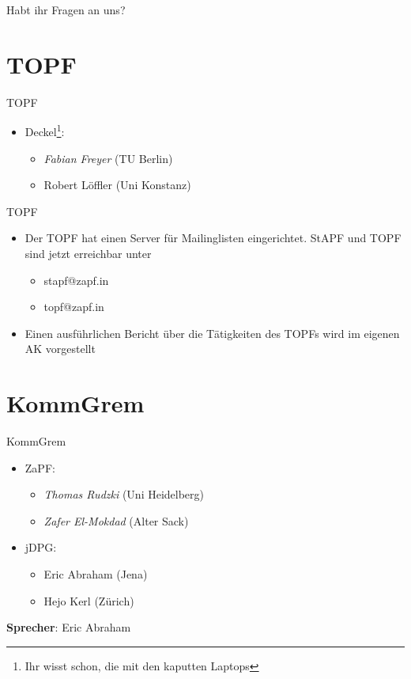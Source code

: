 \documentclass[compress, aspectratio=169]{beamer}
\begin{document}
\begin{frame}[plain]
	\begin{center}
		\Huge Habt ihr Fragen an uns?
	\end{center}
\end{frame}

\section{TOPF}
\begin{frame}{TOPF}
	\begin{itemize}
		\item[] Deckel\footnote{Ihr wisst schon, die mit den kaputten Laptops}:
			\begin{itemize}
				\item \emph{Fabian Freyer} (TU Berlin)
				\item Robert Löffler (Uni Konstanz)
			\end{itemize}
	\end{itemize}
\end{frame}

\begin{frame}{TOPF}
	\begin{itemize}
		\item[] Der TOPF hat einen Server für Mailinglisten eingerichtet. StAPF und TOPF sind jetzt erreichbar unter
			\begin{itemize}
				\item stapf@zapf.in
				\item topf@zapf.in
			\end{itemize}
		\item[] Einen ausführlichen Bericht über die Tätigkeiten des TOPFs wird im eigenen AK vorgestellt
	\end{itemize}
\end{frame}

\section{KommGrem}

\begin{frame}{KommGrem}
	\begin{itemize}
		\item[] ZaPF:
			\begin{itemize}
				\item \emph{Thomas Rudzki} (Uni Heidelberg)
				\item \emph{Zafer El-Mokdad} (Alter Sack)
			\end{itemize}
		\item[] jDPG:
			\begin{itemize}
				\item Eric Abraham (Jena)
				\item Hejo Kerl (Zürich)
			\end{itemize}
	\end{itemize}
	\vspace{0.5cm}
	\textbf{Sprecher}: Eric Abraham
\end{frame}
\end{document}
